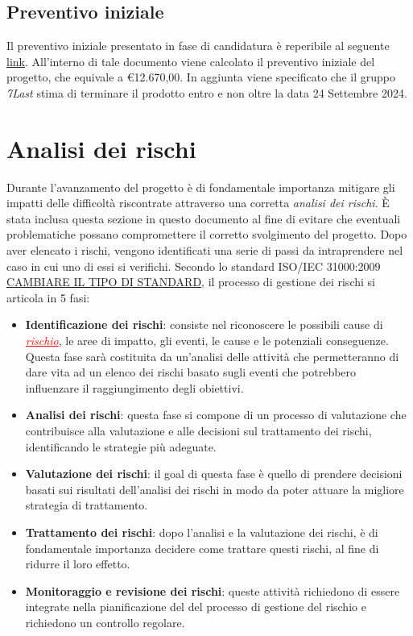 \documentclass[italian,12pt]{article} %
\begin{document}
\subsection{Preventivo iniziale}
Il preventivo iniziale presentato in fase di candidatura è reperibile al seguente \uline{\href{https://github.com/7Last/docs/blob/main/1_candidatura/preventivo_costi_assunzione_impegni_v2.0.pdf}{link}}. All'interno di tale documento viene calcolato il preventivo iniziale del progetto, che equivale a €12.670,00. In aggiunta viene specificato che il gruppo \textit{7Last} stima di terminare il prodotto entro e non oltre la data 24 Settembre 2024.

\section{Analisi dei rischi}
Durante l'avanzamento del progetto è di fondamentale importanza mitigare gli impatti delle difficoltà riscontrate attraverso una corretta \textit{analisi dei rischi}. È stata inclusa questa sezione in questo documento al fine di evitare che eventuali problematiche possano compromettere il corretto svolgimento del progetto. 
Dopo aver elencato i rischi, vengono identificati una serie di passi da intraprendere nel caso in cui uno di essi si verifichi. Secondo lo standard ISO/IEC 31000:2009 \uline{CAMBIARE IL TIPO DI STANDARD}, il processo di gestione dei rischi si articola in 5 fasi:
\begin{itemize}
    \item \textbf{Identificazione dei rischi}: consiste nel riconoscere le possibili cause di \textcolor{red}{\uline{\textit{rischio}}}, le aree di impatto, gli eventi, le cause e le potenziali conseguenze. Questa fase sarà costituita da un'analisi delle attività che permetteranno di dare vita ad un elenco dei rischi basato sugli eventi che potrebbero influenzare il raggiungimento degli obiettivi. 
    \item \textbf{Analisi dei rischi}: questa fase si compone di un processo di valutazione che contribuisce alla valutazione e alle decisioni sul trattamento dei rischi, identificando le strategie più adeguate.
    \item \textbf{Valutazione dei rischi}: il goal di questa fase è quello di prendere decisioni basati sui risultati dell'analisi dei rischi in modo da poter attuare la migliore strategia di trattamento.
    \item \textbf{Trattamento dei rischi}: dopo l'analisi e la valutazione dei rischi, è di fondamentale importanza decidere come trattare questi rischi, al fine di ridurre il loro effetto. 
    \item \textbf{Monitoraggio e revisione dei rischi}: queste attività richiedono di essere integrate nella pianificazione del del processo di gestione del rischio e richiedono un controllo regolare.
\end{itemize}
\end{document}
